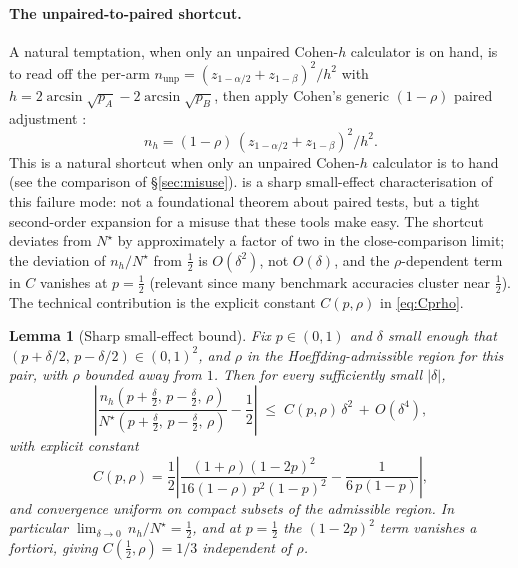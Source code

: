 \documentclass{article}
\theoremstyle{plain}
\newtheorem{lemma}{Lemma}
\theoremstyle{definition}
\begin{document}
\paragraph{The unpaired-to-paired shortcut.} A natural temptation, when only an unpaired Cohen-$h$ calculator is on hand, is to read off the per-arm $n_{\mathrm{unp}} = (z_{1-\alpha/2}+z_{1-\beta})^2/h^2$ \citep[Eq.~6.3.2]{cohen1988power} with $h = 2\arcsin\sqrt{p_A} - 2\arcsin\sqrt{p_B}$, then apply Cohen's generic $(1{-}\rho)$ paired adjustment \citep[Ch.~2]{cohen1988power}:
\begin{equation}
\label{eq:reqn_h}
n_h = (1-\rho)\,(z_{1-\alpha/2}+z_{1-\beta})^2/h^2.
\end{equation}
This is a natural shortcut when only an unpaired Cohen-$h$ calculator is to hand (see the comparison of \S\ref{sec:misuse}).  is a sharp small-effect characterisation of this failure mode: not a foundational theorem about paired tests, but a tight second-order expansion for a misuse that these tools make easy. The shortcut deviates from $N^{\star}$ by approximately a factor of two in the close-comparison limit; the deviation of $n_h/N^{\star}$ from $\tfrac12$ is $O(\delta^2)$, not $O(\delta)$, and the $\rho$-dependent term in $C$ vanishes at $p=\tfrac12$ (relevant since many benchmark accuracies cluster near $\tfrac12$). The technical contribution is the explicit constant $C(p,\rho)$ in \cref{eq:Cprho}.

\begin{lemma}[Sharp small-effect bound]
\label{lem:shortcut}
Fix $p \in (0,1)$ and $\delta$ small enough that $(p{+}\delta/2,\,p{-}\delta/2) \in (0,1)^2$, and $\rho$ in the Hoeffding-admissible region for this pair, with $\rho$ bounded away from $1$. Then for every sufficiently small $|\delta|$,
\begin{equation}
\label{eq:lem}
\left|\frac{n_h(p{+}\tfrac\delta2,\,p{-}\tfrac\delta2,\,\rho)}{N^{\star}(p{+}\tfrac\delta2,\,p{-}\tfrac\delta2,\,\rho)} - \frac{1}{2}\right| \;\leq\; C(p,\rho)\,\delta^2 \,+\, O(\delta^4),
\end{equation}
with explicit constant
\begin{equation}
\label{eq:Cprho}
C(p,\rho) = \frac{1}{2}\left|\frac{(1{+}\rho)(1{-}2p)^2}{16(1{-}\rho)\,p^2(1{-}p)^2} - \frac{1}{6\,p(1{-}p)}\right|,
\end{equation}
and convergence uniform on compact subsets of the admissible region. In particular $\lim_{\delta\to 0}\, n_h/N^{\star} = \tfrac12$, and at $p=\tfrac12$ the $(1{-}2p)^2$ term vanishes a fortiori, giving $C(\tfrac12, \rho) = 1/3$ independent of $\rho$.
\end{lemma}
\end{document}
